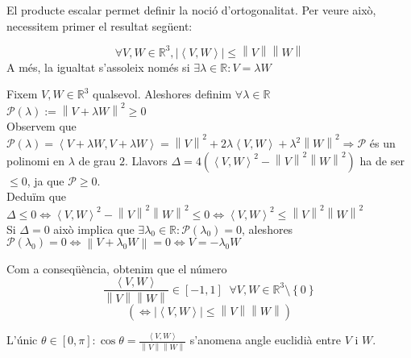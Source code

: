\documentclass[a4paper,12pt]{article}
\begin{document}
	El producte escalar permet definir la noció d'ortogonalitat. Per veure això, necessitem primer el
	resultat següent:
	\begin{teorema}
	    \begin{displaymath}
	        \forall V, W \in \mathbb{R}^3, \left\lvert \left\langle V, W\right\rangle \right\rvert \leq \left\lVert V\right\rVert \left\lVert W\right\rVert
	    \end{displaymath}
	    A més, la igualtat s'assoleix només si $\exists \lambda \in \mathbb{R}: V = \lambda W$
	\end{teorema}
	\begin{demostracio}
	    Fixem $V, W \in \mathbb{R}^3$ qualsevol. Aleshores definim $\forall\lambda\in\mathbb{R}$\\$\mathcal{P}(\lambda):=\left\lVert V+\lambda W\right\rVert^2 \geq 0$\\
	    Observem que $\mathcal{P}(\lambda)=\left\langle V+\lambda W, V+\lambda W\right\rangle = \left\lVert V\right\rVert^2 + 2\lambda\left\langle V,W\right\rangle + \lambda^2\left\lVert W\right\rVert^2 \Rightarrow \mathcal{P}$
	    és un polinomi en $\lambda$ de grau $2$. Llavors $\Delta = 4\left(\left\langle V,W\right\rangle^2 - \left\lVert V\right\rVert^2\left\lVert W\right\rVert^2\right)$ ha de ser $\leq 0$, ja que $\mathcal{P} \geq 0$.\\
	    Deduïm que $\Delta \leq 0 \iff \left\langle V, W\right\rangle^2-\left\lVert V\right\rVert^2\left\lVert W\right\rVert^2 \leq 0 \iff \left\langle V, W\right\rangle^2\leq\left\lVert V\right\rVert^2\left\lVert W\right\rVert^2$\\
	    Si $\Delta = 0$ això implica que $\exists \lambda_0 \in \mathbb{R} : \mathcal{P}\left(\lambda_0\right) = 0$, aleshores $\mathcal{P}\left(\lambda_0\right) = 0 \iff \left\lVert V+\lambda_0 W\right\rVert = 0 \iff V = - \lambda_0 W$
	\end{demostracio}
	Com a conseqüència, obtenim que el número
	\begin{displaymath}
	    \frac{\left\langle V, W\right\rangle}{\left\lVert V\right\rVert\left\lVert W\right\rVert } \in \left[-1, 1\right]\;\;\forall V, W \in \mathbb{R}^3\setminus\left\{0\right\}
	\end{displaymath}
	\begin{displaymath}
	    \left(\iff \left\lvert \left\langle V, W\right\rangle \right\rvert\leq\left\lVert V\right\rVert\left\lVert W\right\rVert\right)
	\end{displaymath}
	\begin{definicio}
	    L'únic $\theta \in \left[0, \pi\right] : \cos{\theta} = \frac{\left\langle V, W\right\rangle}{\left\lVert V\right\rVert\left\lVert W\right\rVert }$
	    s'anomena angle euclidià entre $V\text{ i }W$.
	\end{definicio}
\end{document}

